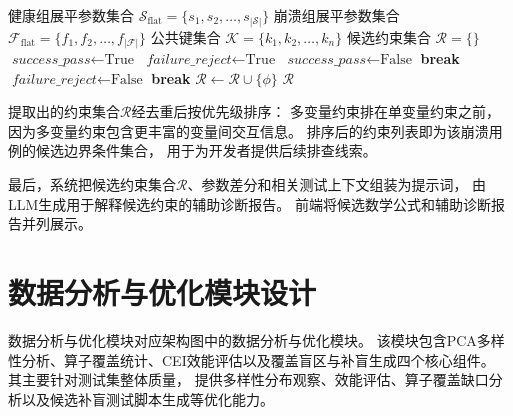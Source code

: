 \begin{algorithm}[H]
\caption{双重验证判据——候选边界条件提取算法}
\label{alg:dual_verify}
\small\linespread{1.0}\selectfont
\begin{algorithmic}[1]
\REQUIRE 健康组展平参数集合 $\mathcal{S}_{\text{flat}} = \{s_1, s_2, \ldots, s_{|\mathcal{S}|}\}$
\REQUIRE 崩溃组展平参数集合 $\mathcal{F}_{\text{flat}} = \{f_1, f_2, \ldots, f_{|\mathcal{F}|}\}$
\REQUIRE 公共键集合 $\mathcal{K} = \{k_1, k_2, \ldots, k_n\}$
\ENSURE 候选约束集合 $\mathcal{R} = \{\}$
    \STATE $\textit{success\_pass} \leftarrow \text{True}$
    \STATE $\textit{failure\_reject} \leftarrow \text{True}$
            \STATE $\textit{success\_pass} \leftarrow \text{False}$
            \STATE \textbf{break}
        \ENDIF
    \ENDFOR
                \STATE $\textit{failure\_reject} \leftarrow \text{False}$
                \STATE \textbf{break}
            \ENDIF
        \ENDFOR
    \ENDIF
        \STATE $\mathcal{R} \leftarrow \mathcal{R} \cup \{\phi\}$
    \ENDIF
\ENDFOR
\RETURN $\mathcal{R}$
\end{algorithmic}
\end{algorithm}

提取出的约束集合$\mathcal{R}$经去重后按优先级排序：
多变量约束排在单变量约束之前，
因为多变量约束包含更丰富的变量间交互信息。
排序后的约束列表即为该崩溃用例的候选边界条件集合，
用于为开发者提供后续排查线索。

最后，系统把候选约束集合$\mathcal{R}$、参数差分和相关测试上下文组装为提示词，
由LLM生成用于解释候选约束的辅助诊断报告。
前端将候选数学公式和辅助诊断报告并列展示。

\section{数据分析与优化模块设计}

数据分析与优化模块对应架构图中的数据分析与优化模块。
该模块包含PCA多样性分析、算子覆盖统计、CEI效能评估以及覆盖盲区与补盲生成四个核心组件。
其主要针对测试集整体质量，
提供多样性分布观察、效能评估、算子覆盖缺口分析以及候选补盲测试脚本生成等优化能力。

